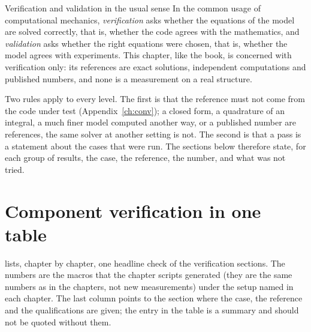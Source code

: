 \begin{sidenote}{Verification and validation in the usual sense}
In the common usage of computational mechanics, \emph{verification} asks whether the equations of the model are solved correctly, that is, whether the code agrees with the mathematics, and \emph{validation} asks whether the right equations were chosen, that is, whether the model agrees with experiments. This chapter, like the book, is concerned with verification only: its references are exact solutions, independent computations and published numbers, and none is a measurement on a real structure.
\end{sidenote}


Two rules apply to every level. The first is that the reference must not come from the code under test (Appendix~\ref{ch:conv}); a closed form, a quadrature of an integral, a much finer model computed another way, or a published number are references, the same solver at another setting is not. The second is that a pass is a statement about the cases that were run. The sections below therefore state, for each group of results, the case, the reference, the number, and what was not tried.

\section{Component verification in one table}\label{sec:vf-component}

 lists, chapter by chapter, one headline check of the verification sections. The numbers are the macros that the chapter scripts generated (they are the same numbers as in the chapters, not new measurements) under the setup named in each chapter. The last column points to the section where the case, the reference and the qualifications are given; the entry in the table is a summary and should not be quoted without them.

